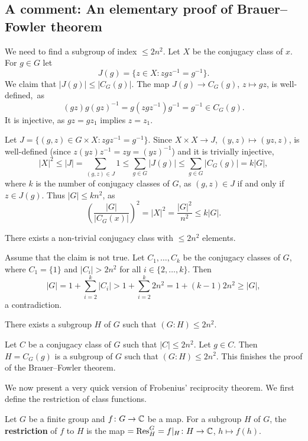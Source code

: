 \subsection{A comment: An elementary proof of Brauer--Fowler theorem}

We need to find a subgroup of index $\leq 2n^2$. 
Let $X$ be the conjugacy class of $x$. For $g\in G$ let
\[
J(g)=\{z\in X:zgz^{-1}=g^{-1}\}.
\]
We claim that $|J(g)|\leq|C_G(g)|$. The map $J(g)\to C_G(g)$, $z\mapsto gz$, 
is well-defined,~as 
\[
(gz)g(gz)^{-1}=g(zgz^{-1})g^{-1}=g^{-1}\in C_G(g).
\]
It is injective, as $gz=gz_1$ implies $z=z_1$.

Let $J=\{(g,z)\in G\times X:zgz^{-1}=g^{-1}\}$.  
Since $X\times X\to J$, $(y,z)\mapsto (yz,z)$, 
is well-defined (since $z(yz)z^{-1}=zy=(yz)^{-1}$) and
it is trivially injective, 
\[
|X|^2\leq |J|=\sum_{(g,z)\in J}1\leq\sum_{g\in G}|J(g)|
\leq\sum_{g\in G}|C_G(g)|=k|G|,
\]
where $k$ is the number of conjugacy classes of $G$, 
as $(g,z)\in J$ if and only if $z\in J(g)$. Thus $|G|\leq kn^2$, as
\[
\left(\frac{|G|}{|C_G(x)|}\right)^2=|X|^2=\frac{|G|^2}{n^2}\leq k|G|.
\]

\begin{claim}
    There exists a non-trivial conjugacy class with $\leq 2n^2$ elements.
\end{claim}

Assume that the claim is not true. Let
$C_1,\dots,C_k$ be the conjugacy classes of $G$, where 
$C_1=\{1\}$ and $|C_i|>2n^2$ for all $i\in\{2,\dots,k\}$. Then
\[
|G|=1+\sum_{i=2}^k|C_i|>1+\sum_{i=2}^k2n^2=1+(k-1)2n^2\geq |G|,
\]
a contradiction. 

\begin{claim}
    There exists a subgroup $H$ of $G$ such that
    $(G:H)\leq 2n^2$.
\end{claim}

Let $C$ be a conjugacy class of $G$ such that 
$|C|\leq 2n^2$. Let $g\in C$.  
Then $H=C_G(g)$ is a subgroup of $G$ such that
$(G:H)\leq 2n^2$. 
This finishes the proof of the Brauer--Fowler theorem. 




We now present a very quick version of Frobenius'
reciprocity theorem. We first 
define the restriction of class functions. 

\begin{definition}
    Let $G$ be a finite group and $f\colon G\to\mathbb{C}$ be
    a map. For a subgroup $H$ of $G$, the \textbf{restriction}
    of $f$ to $H$ is the map 
    $=\operatorname{Res}_H^G=f|_H\colon H\to\mathbb{C}$, $h\mapsto f(h)$. 
\end{definition}


